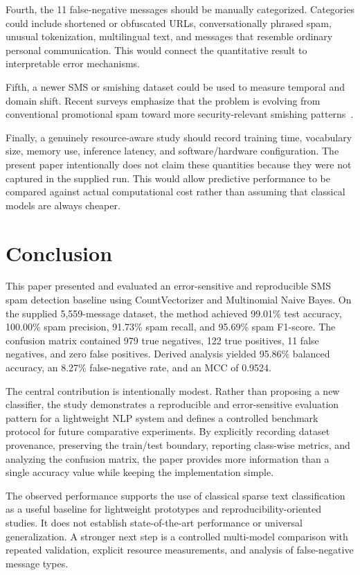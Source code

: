 \documentclass[conference]{IEEEtran}
\begin{document}
Fourth, the 11 false-negative messages should be manually categorized. Categories could include shortened or obfuscated URLs, conversationally phrased spam, unusual tokenization, multilingual text, and messages that resemble ordinary personal communication. This would connect the quantitative result to interpretable error mechanisms.

Fifth, a newer SMS or smishing dataset could be used to measure temporal and domain shift. Recent surveys emphasize that the problem is evolving from conventional promotional spam toward more security-relevant smishing patterns~\cite{saidat2024survey}.

Finally, a genuinely resource-aware study should record training time, vocabulary size, memory use, inference latency, and software/hardware configuration. The present paper intentionally does not claim these quantities because they were not captured in the supplied run. This would allow predictive performance to be compared against actual computational cost rather than assuming that classical models are always cheaper.

\section{Conclusion}
This paper presented and evaluated an error-sensitive and reproducible SMS spam detection baseline using CountVectorizer and Multinomial Naive Bayes. On the supplied 5,559-message dataset, the method achieved 99.01\% test accuracy, 100.00\% spam precision, 91.73\% spam recall, and 95.69\% spam F1-score. The confusion matrix contained 979 true negatives, 122 true positives, 11 false negatives, and zero false positives. Derived analysis yielded 95.86\% balanced accuracy, an 8.27\% false-negative rate, and an MCC of 0.9524.

The central contribution is intentionally modest. Rather than proposing a new classifier, the study demonstrates a reproducible and error-sensitive evaluation pattern for a lightweight NLP system and defines a controlled benchmark protocol for future comparative experiments. By explicitly recording dataset provenance, preserving the train/test boundary, reporting class-wise metrics, and analyzing the confusion matrix, the paper provides more information than a single accuracy value while keeping the implementation simple.

The observed performance supports the use of classical sparse text classification as a useful baseline for lightweight prototypes and reproducibility-oriented studies. It does not establish state-of-the-art performance or universal generalization. A stronger next step is a controlled multi-model comparison with repeated validation, explicit resource measurements, and analysis of false-negative message types.
\end{document}
